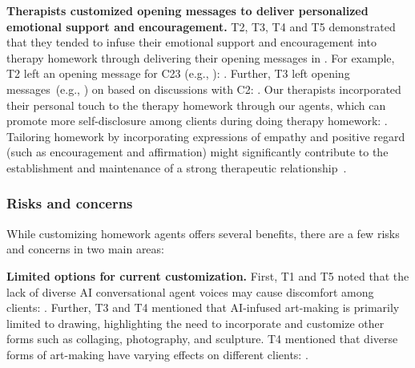 \textbf{Therapists customized opening messages to deliver personalized emotional support and encouragement.} 
T2, T3, T4 and T5 demonstrated that they tended to infuse their emotional support and encouragement into therapy homework through delivering their opening messages in \name{}.
For example, T2 left an opening message for C23 (e.g., ): . 
Further, T3 left opening messages~(e.g., ) on \name{} based on discussions with C2: .
Our therapists incorporated their personal touch to the therapy homework through our agents, which can promote more self-disclosure among clients during doing therapy homework: .
Tailoring homework by incorporating expressions of empathy and positive regard (such as encouragement and affirmation) might significantly contribute to the establishment and maintenance of a strong therapeutic relationship~\cite{cronin2015integrating}.


\subsubsection{\textbf{Risks and concerns}}
While customizing homework agents offers several benefits, there are a few risks and concerns in two main areas:

\textbf{Limited options for current customization.}
First, T1 and T5 noted that the lack of diverse AI conversational agent voices may cause discomfort among clients: . 
Further, T3 and T4 mentioned that AI-infused art-making is primarily limited to drawing, highlighting the need to incorporate and customize other forms such as collaging, photography, and sculpture. 
T4 mentioned that diverse forms of art-making have varying effects on different clients: .

